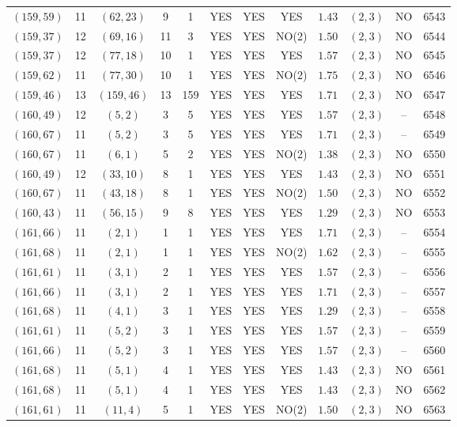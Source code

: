 \begin{longtable}{|c|c|c|c|c|c|c|c|c|c|c|c|}
$(159,59)$ & 11 & $(62,23)$ & 9 & 1 & YES & YES & YES & $1.43$ & $(2,3)$ & NO & 6543\\
$(159,37)$ & 12 & $(69,16)$ & 11 & 3 & YES & YES & NO(2) & $1.50$ & $(2,3)$ & NO & 6544\\
$(159,37)$ & 12 & $(77,18)$ & 10 & 1 & YES & YES & YES & $1.57$ & $(2,3)$ & NO & 6545\\
$(159,62)$ & 11 & $(77,30)$ & 10 & 1 & YES & YES & NO(2) & $1.75$ & $(2,3)$ & NO & 6546\\
$(159,46)$ & 13 & $(159,46)$ & 13 & 159 & YES & YES & YES & $1.71$ & $(2,3)$ & NO & 6547\\
$(160,49)$ & 12 & $(5,2)$ & 3 & 5 & YES & YES & YES & $1.57$ & $(2,3)$ & -- & 6548\\
$(160,67)$ & 11 & $(5,2)$ & 3 & 5 & YES & YES & YES & $1.71$ & $(2,3)$ & -- & 6549\\
$(160,67)$ & 11 & $(6,1)$ & 5 & 2 & YES & YES & NO(2) & $1.38$ & $(2,3)$ & NO & 6550\\
$(160,49)$ & 12 & $(33,10)$ & 8 & 1 & YES & YES & YES & $1.43$ & $(2,3)$ & NO & 6551\\
$(160,67)$ & 11 & $(43,18)$ & 8 & 1 & YES & YES & NO(2) & $1.50$ & $(2,3)$ & NO & 6552\\
$(160,43)$ & 11 & $(56,15)$ & 9 & 8 & YES & YES & YES & $1.29$ & $(2,3)$ & NO & 6553\\
$(161,66)$ & 11 & $(2,1)$ & 1 & 1 & YES & YES & YES & $1.71$ & $(2,3)$ & -- & 6554\\
$(161,68)$ & 11 & $(2,1)$ & 1 & 1 & YES & YES & NO(2) & $1.62$ & $(2,3)$ & -- & 6555\\
$(161,61)$ & 11 & $(3,1)$ & 2 & 1 & YES & YES & YES & $1.57$ & $(2,3)$ & -- & 6556\\
$(161,66)$ & 11 & $(3,1)$ & 2 & 1 & YES & YES & YES & $1.71$ & $(2,3)$ & -- & 6557\\
$(161,68)$ & 11 & $(4,1)$ & 3 & 1 & YES & YES & YES & $1.29$ & $(2,3)$ & -- & 6558\\
$(161,61)$ & 11 & $(5,2)$ & 3 & 1 & YES & YES & YES & $1.57$ & $(2,3)$ & -- & 6559\\
$(161,66)$ & 11 & $(5,2)$ & 3 & 1 & YES & YES & YES & $1.57$ & $(2,3)$ & -- & 6560\\
$(161,68)$ & 11 & $(5,1)$ & 4 & 1 & YES & YES & YES & $1.43$ & $(2,3)$ & NO & 6561\\
$(161,68)$ & 11 & $(5,1)$ & 4 & 1 & YES & YES & YES & $1.43$ & $(2,3)$ & NO & 6562\\
$(161,61)$ & 11 & $(11,4)$ & 5 & 1 & YES & YES & NO(2) & $1.50$ & $(2,3)$ & NO & 6563\\

\end{longtable}
